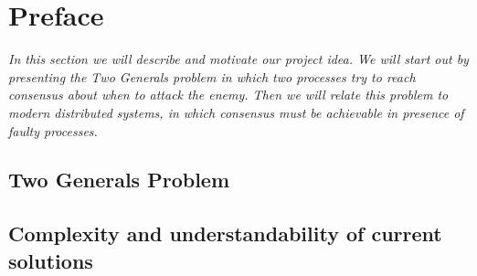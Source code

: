 \section{Preface}

\textit{In this section we will describe and motivate our project idea. We will start out by presenting the Two Generals problem in which two processes try to reach consensus about when to attack the enemy. Then we will relate this problem to modern distributed systems, in which consensus must be achievable in presence of faulty processes.}

\subsection{Two Generals Problem}

\subsection{Complexity and understandability of current solutions}

